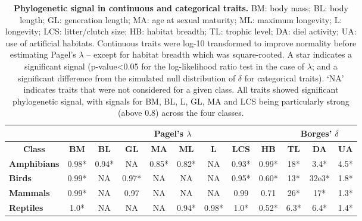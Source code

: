 \begin{table}[h!]
\renewcommand{\baselinestretch}{1}
\renewcommand{\arraystretch}{1.2}
\begin{center}\fontsize{9}{11}\selectfont
\caption[Phylogenetic signal in continuous and categorical traits]{\textbf{Phylogenetic signal in continuous and categorical traits.} BM: body mass; BL: body length; GL: generation length; MA: age at sexual maturity; ML: maximum longevity; L: longevity; LCS: litter/clutch size; HB: habitat breadth; TL: trophic level; DA: diel activity; UA: use of artificial habitats. Continuous traits were log-10 transformed to improve normality before estimating Pagel’s $\lambda$ – except for habitat breadth which was square-rooted. A star indicates a significant signal (p-value<0.05 for the log-likelihood ratio test in the case of $\lambda$; and a significant difference from the simulated null distribution of $\delta$ for categorical traits). ‘NA’ indicates traits that were not considered for a given class. All traits showed significant phylogenetic signal, with signals for BM, BL, L, GL, MA and LCS being particularly strong (above 0.8) across the four classes. }
\label{SI3_Table2}  
\begin{tabular}{l|c|c|c|c|c|c|c|c|c|c|c|}
\cline{2-12}
                                          & \multicolumn{8}{c|}{\textbf{Pagel's $\lambda$}}                                                                       & \multicolumn{3}{c|}{\textbf{Borges' $\delta$}} \\ \hline
\multicolumn{1}{|c|}{\textbf{Class}}      & \textbf{BM} & \textbf{BL} & \textbf{GL} & \textbf{MA} & \textbf{ML} & \textbf{L} & \textbf{LCS} & \textbf{HB} & \textbf{TL} & \textbf{DA} & \textbf{UA} \\ \hline
\multicolumn{1}{|l|}{\textbf{Amphibians}} & 0.98*       & 0.94*       & NA          & 0.85*       & 0.82*       & NA         & 0.93*        & 0.99*       & 18*         & 3.4*        & 4.5*        \\ %
\multicolumn{1}{|l|}{\textbf{Birds}}      & 0.99*       & NA          & 0.97*       & NA          & NA          & NA         & 0.95*        & 0.60*       & 13*         & 32e3*       & 1.8*        \\ %
\multicolumn{1}{|l|}{\textbf{Mammals}}    & 0.99*       & NA          & 0.97        & NA          & NA          & NA         & 0.99         & 0.71        & 26*         & 17*         & 1.3*        \\ %
\multicolumn{1}{|l|}{\textbf{Reptiles}}   & 1.0*        & NA          & NA          & NA          & 0.94*       & 0.98*      & 1.0*         & 0.52*       & 6.3*        & 6.4*        & 1.4*        \\ \hline
\end{tabular}
\end{center}
\end{table}

